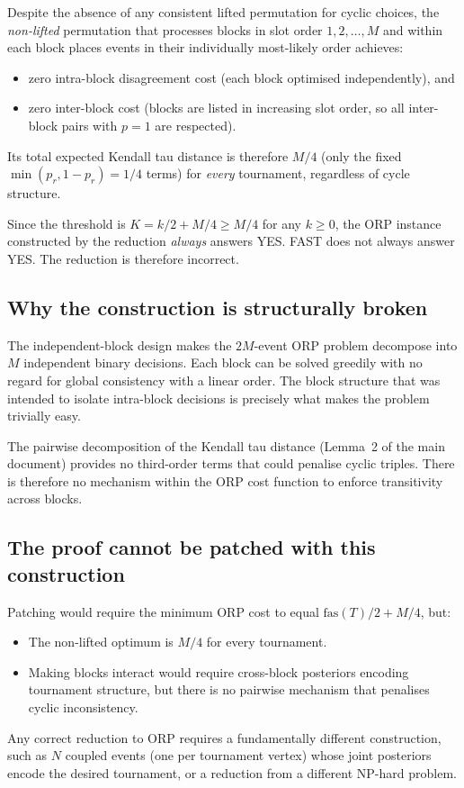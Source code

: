 \documentclass[11pt]{article}
\begin{document}
Despite the absence of any consistent lifted permutation for cyclic choices, the
\emph{non-lifted} permutation that processes blocks in slot order $1, 2, \ldots, M$
and within each block places events in their individually most-likely order achieves:
\begin{itemize}
\item zero intra-block disagreement cost (each block optimised independently), and
\item zero inter-block cost (blocks are listed in increasing slot order, so all
  inter-block pairs with $p = 1$ are respected).
\end{itemize}
Its total expected Kendall tau distance is therefore $M/4$ (only the fixed
$\min(p_r, 1-p_r) = 1/4$ terms) for \emph{every} tournament, regardless of cycle
structure.

Since the threshold is $K = k/2 + M/4 \ge M/4$ for any $k \ge 0$, the ORP instance
constructed by the reduction \emph{always} answers YES\@.  FAST does not always
answer YES.  The reduction is therefore incorrect.

\subsection{Why the construction is structurally broken}

The independent-block design makes the $2M$-event ORP problem decompose into $M$
independent binary decisions.  Each block can be solved greedily with no regard for
global consistency with a linear order.  The block structure that was intended to
isolate intra-block decisions is precisely what makes the problem trivially easy.

The pairwise decomposition of the Kendall tau distance (Lemma~2 of the main
document) provides no third-order terms that could penalise cyclic triples.  There is
therefore no mechanism within the ORP cost function to enforce transitivity across
blocks.

\subsection{The proof cannot be patched with this construction}

Patching would require the minimum ORP cost to equal $\mathrm{fas}(T)/2 + M/4$, but:
\begin{itemize}
\item The non-lifted optimum is $M/4$ for every tournament.
\item Making blocks interact would require cross-block posteriors encoding tournament
  structure, but there is no pairwise mechanism that penalises cyclic inconsistency.
\end{itemize}
Any correct reduction to ORP requires a fundamentally different construction, such as
$N$ coupled events (one per tournament vertex) whose joint posteriors encode the
desired tournament, or a reduction from a different NP-hard problem.
\end{document}
